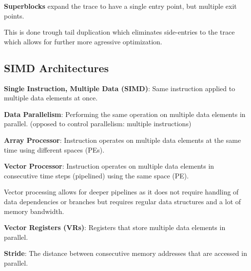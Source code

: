\begin{definition}
    \textbf{Superblocks} expand the trace to have a single entry point, but multiple exit points. 
\end{definition}

\begin{remark}
    This is done trough tail duplication which eliminates side-entries to the trace which allows for further more agressive optimization.
\end{remark}

\subsection{SIMD Architectures}

\begin{definition}
    \textbf{Single Instruction, Multiple Data (SIMD)}: Same instruction applied to multiple data elements at once.
\end{definition}

\begin{definition}
    \textbf{Data Parallelism}: Performing the same operation on multiple data elements in parallel. (opposed to control parallelism: multiple instructions)
\end{definition}

\begin{definition}
    \textbf{Array Processor}: Instruction operates on multiple data elements at the same time using different spaces (PEs).
\end{definition}

\begin{definition}
    \textbf{Vector Processor}: Instruction operates on multiple data elements in consecutive time steps (pipelined) using the same space (PE).
\end{definition}

\begin{remark}
    Vector processing allows for deeper pipelines as it does not require handling of data dependencies or branches but requires regular data structures and a lot of memory bandwidth.
\end{remark}

\begin{definition}
    \textbf{Vector Registers (VRs)}: Registers that store multiple data elements in parallel.
\end{definition}

\begin{definition}
    \textbf{Stride}: The distance between consecutive memory addresses that are accessed in parallel.
\end{definition}

